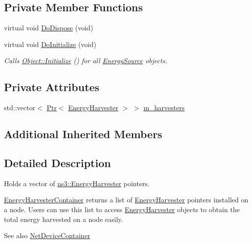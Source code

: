 \subsection*{Private Member Functions}
\begin{DoxyCompactItemize}
\item 
virtual void \hyperlink{classns3_1_1EnergyHarvesterContainer_a99eaa918d2203440cc5581195c485c0f}{Do\+Dispose} (void)
\item 
virtual void \hyperlink{classns3_1_1EnergyHarvesterContainer_a81ed11076142be6a21aaa10e6b1ce5f9}{Do\+Initialize} (void)
\begin{DoxyCompactList}\small\item\em Calls \hyperlink{classns3_1_1Object_af4411cb29971772fcd09203474a95078}{Object\+::\+Initialize} () for all \hyperlink{classns3_1_1EnergySource}{Energy\+Source} objects. \end{DoxyCompactList}\end{DoxyCompactItemize}
\subsection*{Private Attributes}
\begin{DoxyCompactItemize}
\item 
std\+::vector$<$ \hyperlink{classns3_1_1Ptr}{Ptr}$<$ \hyperlink{classns3_1_1EnergyHarvester}{Energy\+Harvester} $>$ $>$ \hyperlink{classns3_1_1EnergyHarvesterContainer_a349e5cd702eca63e57c42d451eb4ec2d}{m\+\_\+harvesters}
\end{DoxyCompactItemize}
\subsection*{Additional Inherited Members}


\subsection{Detailed Description}
Holds a vector of \hyperlink{classns3_1_1EnergyHarvester}{ns3\+::\+Energy\+Harvester} pointers. 

\hyperlink{classns3_1_1EnergyHarvesterContainer}{Energy\+Harvester\+Container} returns a list of \hyperlink{classns3_1_1EnergyHarvester}{Energy\+Harvester} pointers installed on a node. Users can use this list to access \hyperlink{classns3_1_1EnergyHarvester}{Energy\+Harvester} objects to obtain the total energy harvested on a node easily.

\begin{DoxySeeAlso}{See also}
\hyperlink{classns3_1_1NetDeviceContainer}{Net\+Device\+Container} 
\end{DoxySeeAlso}


